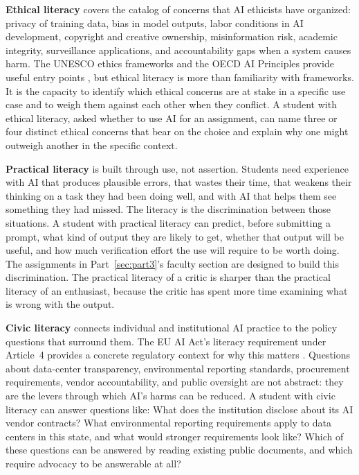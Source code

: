\documentclass[12pt]{article}
\begin{document}
\textbf{Ethical literacy} covers the catalog of concerns that AI ethicists have organized: privacy of training data, bias in model outputs, labor conditions in AI development, copyright and creative ownership, misinformation risk, academic integrity, surveillance applications, and accountability gaps when a system causes harm. The UNESCO ethics frameworks and the OECD AI Principles provide useful entry points \autocites{unesco2024recommendation}{oecd2024principles}, but ethical literacy is more than familiarity with frameworks. It is the capacity to identify which ethical concerns are at stake in a specific use case and to weigh them against each other when they conflict. A student with ethical literacy, asked whether to use AI for an assignment, can name three or four distinct ethical concerns that bear on the choice and explain why one might outweigh another in the specific context.

\textbf{Practical literacy} is built through use, not assertion. Students need experience with AI that produces plausible errors, that wastes their time, that weakens their thinking on a task they had been doing well, and with AI that helps them see something they had missed. The literacy is the discrimination between those situations. A student with practical literacy can predict, before submitting a prompt, what kind of output they are likely to get, whether that output will be useful, and how much verification effort the use will require to be worth doing. The assignments in Part~\ref{sec:part3}'s faculty section are designed to build this discrimination. The practical literacy of a critic is sharper than the practical literacy of an enthusiast, because the critic has spent more time examining what is wrong with the output.

\textbf{Civic literacy} connects individual and institutional AI practice to the policy questions that surround them. The EU AI Act's literacy requirement under Article~4 provides a concrete regulatory context for why this matters \autocite{eu2024aiact}. Questions about data-center transparency, environmental reporting standards, procurement requirements, vendor accountability, and public oversight are not abstract: they are the levers through which AI's harms can be reduced. A student with civic literacy can answer questions like: What does the institution disclose about its AI vendor contracts? What environmental reporting requirements apply to data centers in this state, and what would stronger requirements look like? Which of these questions can be answered by reading existing public documents, and which require advocacy to be answerable at all?
\end{document}
